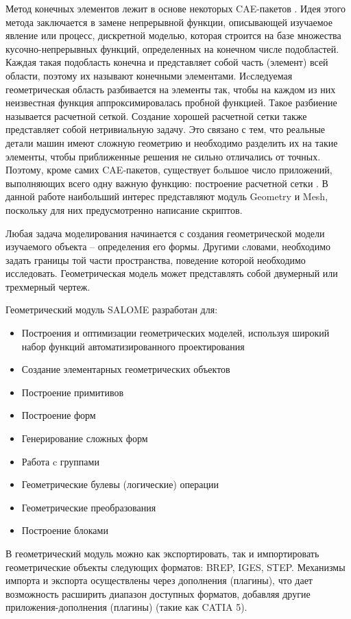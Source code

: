 \documentclass[a4paper,12pt]{article}
\theoremstyle{plain} %
\theoremstyle{definition} %
\theoremstyle{remark} %
\begin{document}
	 Метод конечных элементов лежит в основе некоторых CAE-пакетов . Идея этого метода заключается в замене непрерывной функции, описывающей изучаемое явление или процесс, дискретной моделью, которая строится на базе множества кусочно-непрерывных функций, определенных на конечном числе подобластей. Каждая такая подобласть конечна и представляет собой часть (элемент) всей области, поэтому их называют конечными элементами. Иcследуемая геометрическая область разбивается на элементы так, чтобы на каждом из них неизвестная функция аппроксимировалась пробной функцией. Такое разбиение называется расчетной сеткой. Создание хорошей расчетной сетки также представляет собой нетривиальную задачу. Это связано с тем, что реальные детали машин имеют сложную геометрию и необходимо разделить их на такие элементы, чтобы приближенные решения не сильно отличались от точных. Поэтому, кроме самих CAE-пакетов, существует бoльшое число приложений, выполняющих всего одну важную функцию: построение расчетной сетки \cite{wIbmSALOME}. В данной работе наибольший интерес представляют модуль Geometry и Mesh, поскольку для них предусмотренно написание скриптов.
	
	Любая задача моделирования начинается с создания геометрической модели изучаемого объекта – определения его формы. Другими cловами, необходимо задать границы той части пространства, поведение которой необходимо исследовать. Геометрическая модель может представлять собой двумерный или трехмерный чертеж.
		
	Геометрический модуль SALOME разработан для:
	\begin{itemize}
		\item Построения и оптимизации геометрических моделей, используя широкий набор функций автоматизированного проектирования
		\item Создание элементарных геометрических объектов
		\item Построение примитивов
		\item Построение форм
		\item Генерирование сложных форм
		\item Работа c группами
		\item Геометрические булевы (логические) операции
		\item Геометрические преобразования
		\item Построение блоками
	\end{itemize}
	
	В геометрический модуль можно как экспортировать, так и импортировать геометрические объекты следующих форматов: BREP, IGES, STEP. Механизмы импорта и экспорта осуществлены через дополнения (плагины), что дает возможность расширить диапазон доступных форматов, добавляя другие приложения-дополнения (плагины) (такие как CATIA 5)\cite{wLadugaGeom}.
	
\end{document}
